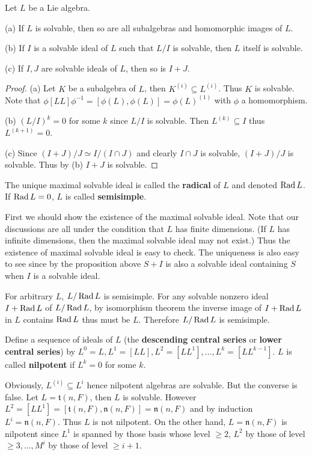 \begin{proposition}
    Let $L$ be a Lie algebra.

    (a) If $L$ is solvable, then so are all subalgebras and homomorphic images of $L$.

    (b) If $I$ is a solvable ideal of $L$ such that $L/I$ is solvable, then $L$ itself is solvable.

    (c) If $I,J$ are solvable ideals of $L$, then so is $I+J$.
\end{proposition}
\begin{proof}
    (a) Let $K$ be a subalgebra of $L$, then $K^{(i)} \subseteq L^{(i)}$. Thus $K$ is solvable. Note that $\phi [LL]\phi^{-1}=[\phi(L),\phi(L)]=\phi(L)^{(1)}$ with $\phi$ a homomorphism. 

    (b) $(L/I)^{k}=0$ for some $k$ since $L/I$ is solvable. Then $L^{(k)}\subseteq I$ thus $L^{(k+1)}=0$.

    (c) Since $(I+J)/J \simeq I/(I \cap J)$ and clearly $I \cap J$ is solvable, $(I+J)/J$ is solvable. Thus by (b) $I+J$ is solvable.
\end{proof}

\begin{definition}
    The unique maximal solvable ideal is called the \textbf{radical} of $L$ and denoted $\operatorname{Rad} L$. If $\operatorname{Rad} L =0$, $L $ is called \textbf{semisimple}.
\end{definition}
\begin{remark}
    First we should show the existence of the maximal solvable ideal. Note that our discussions are all under the condition that $L$ has finite dimensions. (If $L$ has infinite dimensions, then the maximal solvable ideal may not exist.) Thus the existence of maximal solvable ideal is easy to check. The uniqueness is also easy to see since by the proposition above $S+I$ is also a solvable ideal containing $S$ when $I$ is a solvable ideal.
\end{remark}
\begin{example}
    For arbitrary $L$, $L/\operatorname{Rad} L$ is semisimple. For any solvable nonzero ideal $I+\operatorname{Rad} L$ of $L/\operatorname{Rad} L$, by isomorphism theorem the inverse image of $I+\operatorname{Rad} L$ in $L$ contains $\operatorname{Rad} L$ thus must be $L$. Therefore $L/\operatorname{Rad} L$ is semisimple.
\end{example}

\begin{definition}
    Define a sequence of ideals of $L$ (the \textbf{descending central series} or \textbf{lower central series}) by $L^0=L, L^1=[LL], L^2=[LL^1], \ldots,L^k=[LL^{k-1}]$. $L$ is called \textbf{nilpotent} if $L^k=0$ for some $k$. 
\end{definition}
\begin{example}
    Obviously, $L^{(i)} \subseteq L^i$ hence nilpotent algebras are solvable. But the converse is false. Let $L=\mathfrak{t}(n,F)$, then $L$ is solvable. However $L^2=[LL^1]=[\mathfrak{t}(n,F),\mathfrak{n}(n,F)]=\mathfrak{n}(n,F)$ and by induction $L^i=\mathfrak{n}(n,F)$. Thus $L$ is not nilpotent. On the other hand, $L=\mathfrak{n}(n,F)$ is nilpotent since $L^1$ is spanned by those basis whose level $\geqslant 2$, $L^2$ by those of level $\geqslant 3, \ldots, M^i$ by those of level $\geqslant i+1$.
\end{example}

